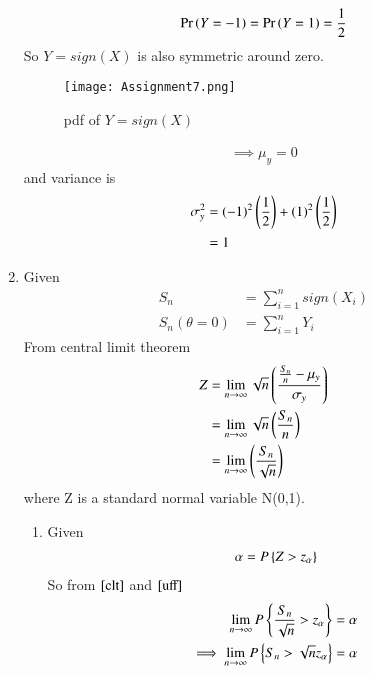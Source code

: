 \documentclass[journal,12pt,twocolumn]{IEEEtran}
\begin{document}
\begin{enumerate}
\begin{align}
   \Pr\left(Y=-1\right)=\Pr\left(Y=1\right)=\frac{1}{2} 
\end{align}
So $Y=sign(X)$ is also symmetric around zero.
\begin{figure}[!ht]
\centering
\texttt{[image: Assignment7.png]}
\caption{pdf of $ Y=sign(X)$}
\label{pdf}
\end{figure}
\begin{align}
   \implies \mu_y = 0 
\end{align}
and variance is
\begin{align}
    \sigma_y^2 &= (-1)^2\left(\frac{1}{2}\right)+(1)^2\left(\frac{1}{2}\right)\\
    &=1
\end{align}
\item Given
\begin{align}
    S_n&=\sum_{i=1}^{n} sign(X_i)\\
    S_n(\theta=0)&=\sum_{i=1}^{n} Y_i
\end{align}
From central limit theorem 
\begin{align}
    Z&=\lim_{n\to\infty}\sqrt{n}\left(\frac{\frac{S_n}{n}-\mu_y}{\sigma_y}\right)\\
    &=\lim_{n\to\infty}\sqrt{n}\left(\frac{S_n}{n}\right)\\
    &=\lim_{n\to\infty}\left(\frac{S_n}{\sqrt{n}}\right)
    \label{clt}
\end{align}
where Z is a standard normal variable N(0,1).
\begin{enumerate}
    \item Given
\begin{align}
    \alpha = P\left\{Z>z_\alpha\right\}\label{uff}
\end{align}
So from $\eqref{clt}$ and $\eqref{uff}$
\begin{align}
\lim_{n\to\infty}P\left\{\frac{S_n}{\sqrt{n}}>z_\alpha\right\}&=
\alpha\\
\implies \lim_{n\to\infty}P\left\{S_n>\sqrt{n}z_\alpha\right\}&=
\alpha
\end{align}
\end{enumerate}
\end{enumerate}
\end{document}
